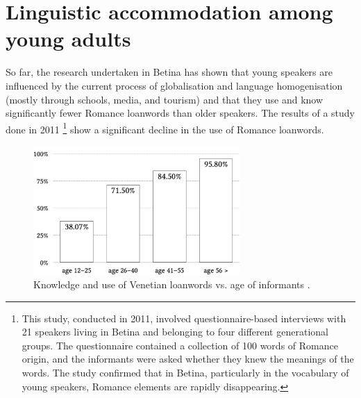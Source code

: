 \documentclass[output=paper]{LSP/langsci}
\begin{document}
\section{Linguistic accommodation among young adults}

So far, the research undertaken in Betina has shown that young speakers are influenced by the current process of globalisation and language homogenisation (mostly through schools, media, and tourism) and that they use and know significantly fewer Romance loanwords than older speakers. The results of a study done in 2011 \citep{skevin_izmedu_2012}\footnote{This study, conducted in 2011, involved questionnaire-based interviews with 21 speakers living in Betina and belonging to four different generational groups. The questionnaire contained a collection of 100 words of Romance origin, and the informants were asked whether they knew the meanings of the words. The study confirmed that in Betina, particularly in the vocabulary of young speakers, Romance elements are rapidly disappearing.} show a significant decline in the use of Romance loanwords. 
  
\begin{figure} 
\includegraphics[width=0.7\textwidth]{illustrations/skevin_fig1.pdf}
\caption{Knowledge and use of Venetian loanwords vs. age of informants \citep[175]{skevin_izmedu_2012}.}
\label{fig:skevin:1}
\end{figure} 
\end{document}
